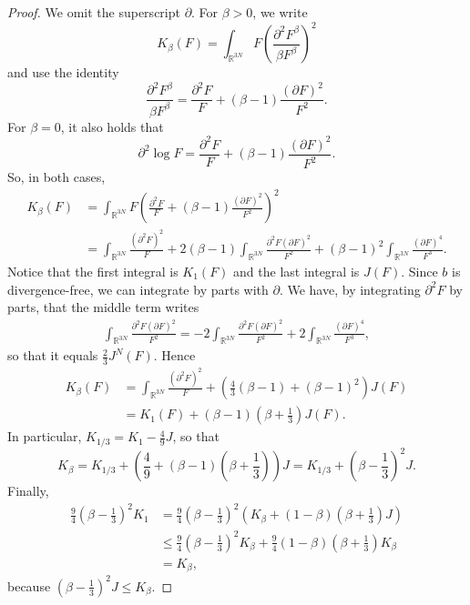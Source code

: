 \documentclass[11pt,a4paper]{article}
\theoremstyle{definition}
\theoremstyle{plain}
\begin{document}
\begin{proof}
    We omit the superscript $\partial$. For $\beta>0$, we write
    $$K_{\beta}(F)=\int_{\mathbb{R}^{3N}} F\left( \frac{\partial^2 F^\beta}{\beta F^\beta}\right)^2$$
    and use the identity
    $$\frac{\partial^2 F^\beta}{\beta F^\beta}=\frac{\partial^2 F}{F}+(\beta-1)\frac{(\partial F)^2}{F^2}.$$
    For $\beta=0$, it also holds that
    $$\partial^2 \log F=\frac{\partial^2 F}{F}+(\beta-1)\frac{(\partial F)^2}{F^2}.$$
    So, in both cases,
    \begin{align*}
       K_\beta (F)&= \int_{\mathbb{R}^{3N}} F\left( \frac{\partial^2 F}{F}+(\beta-1)\frac{(\partial F)^2}{F^2}\right)^2\\
       &=\int_{\mathbb{R}^{3N}} \frac{(\partial^2 F)^2}{F} + 2(\beta-1)\int_{\mathbb{R}^{3N}} \frac{\partial^2 F(\partial F)^2}{F^2}+(\beta-1)^2\int_{\mathbb{R}^{3N}} \frac{(\partial F)^4}{F^3}.
    \end{align*}
    Notice that the first integral is $K_1(F)$ and the last integral is $J(F)$. Since $b$ is divergence-free, we can integrate by parts with $\partial$. We have, by integrating $\partial^2 F$ by parts, that the middle term writes
    \begin{align*}
    \int_{\mathbb{R}^{3N}} \frac{\partial^2 F(\partial F)^2}{F^2} =-2\int_{\mathbb{R}^{3N}} \frac{\partial^2 F(\partial F)^2}{F^2} +2 \int_{\mathbb{R}^{3N}} \frac{(\partial F)^4}{F^3},
    \end{align*}
    so that it equals $\frac{2}{3}J^N(F)$. Hence
    \begin{align*}
       K_\beta (F)
       &=\int_{\mathbb{R}^{3N}} \frac{(\partial^2 F)^2}{F} + \left(\frac{4}{3}(\beta-1)+(\beta-1)^2\right)J(F)\\
       &=K_1(F) + (\beta-1)(\beta+\frac{1}{3})J(F).
    \end{align*}
    In particular, 
    $K_{1/3}=K_1-\frac{4}{9}J$, so that
    $$K_\beta = K_{1/3} + \left(\frac{4}{9}+ (\beta-1)(\beta+\frac{1}{3})\right)J= K_{1/3} + (\beta-\frac{1}{3})^2J. $$
    Finally,
    \begin{align*}
        \frac{9}{4}(\beta-\frac{1}{3})^2K_1
        &=\frac{9}{4}(\beta-\frac{1}{3})^2 \left(K_\beta+(1-\beta)(\beta+\frac{1}{3})J\right)\\
        &\leq \frac{9}{4}(\beta-\frac{1}{3})^2 K_\beta +\frac{9}{4}(1-\beta)(\beta+\frac{1}{3})K_\beta \\
        &=K_\beta,
    \end{align*}
    because $(\beta-\frac{1}{3})^2 J \leq K_\beta$.
\end{proof}
\end{document}
